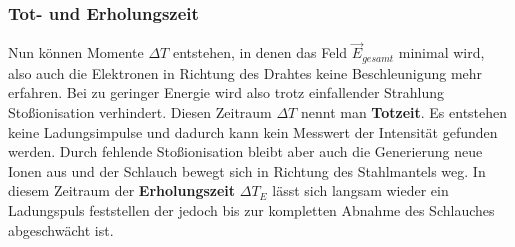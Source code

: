\subsubsection{Tot- und Erholungszeit}
Nun können Momente $\Delta T$ entstehen, in denen das Feld $\vec{E}_{gesamt}$ minimal wird, also auch die Elektronen in Richtung des Drahtes keine Beschleunigung mehr erfahren. 
Bei zu geringer Energie wird also trotz einfallender Strahlung Stoßionisation verhindert. Diesen Zeitraum $\Delta T$ nennt man \textbf{Totzeit}. Es entstehen keine Ladungsimpulse und dadurch kann kein Messwert der Intensität gefunden werden.
Durch fehlende Stoßionisation bleibt aber auch die Generierung neue Ionen aus und der Schlauch bewegt sich in Richtung des Stahlmantels weg. 
In diesem Zeitraum der \textbf{Erholungszeit} $\Delta T_E$ lässt sich langsam wieder ein Ladungspuls feststellen der jedoch bis zur kompletten Abnahme des Schlauches abgeschwächt ist.

